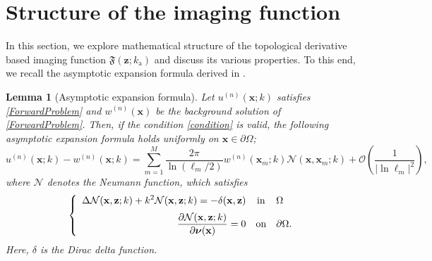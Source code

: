 \documentclass[a4,10pt]{article}
\newcommand{\ka}{k_{\mathrm{a}}}
\newcommand{\p}{\partial}
\newcommand{\mx}{\mathbf{x}}
\newcommand{\mz}{\mathbf{z}}
\newcommand{\vn}{\boldsymbol{\nu}}
\theoremstyle{plain}
\newtheorem{lemma}{Lemma}[section]
\theoremstyle{remark}
\begin{document}
\section{Structure of the imaging function}\label{sec:3}
In this section, we explore mathematical structure of the topological derivative based imaging function $\mathfrak{F}(\mz;\ka)$ and discuss its various properties. To this end, we recall the asymptotic expansion formula derived in \cite{AKLP}.

\begin{lemma}[Asymptotic expansion formula]
Let $u^{(n)}(\mx;k)$ satisfies \eqref{ForwardProblem} and $w^{(n)}(\mx)$ be the background solution of \eqref{ForwardProblem}. Then, if the condition \eqref{condition} is valid, the following asymptotic expansion formula holds uniformly on $\mx\in\p\Omega$;
\begin{equation}\label{Asymptoticformula}
u^{(n)}(\mx;k)-w^{(n)}(\mx;k)=\sum_{m=1}^{M}\frac{2\pi}{\ln(\ell_m/2)}w^{(n)}(\mx_m;k)\mathcal{N}(\mx,\mx_m;k)+\mathcal{O}\left(\frac{1}{|\ln\ell_m|^2}\right),
\end{equation}
where $\mathcal{N}$ denotes the Neumann function, which satisfies
\[\left\{\begin{array}{rcl}
    \displaystyle\Delta \mathcal{N}(\mx,\mz;k)+k^2\mathcal{N}(\mx,\mz;k)=-\delta(\mx,\mz)&\mbox{in}&\Omega\\
\noalign{\medskip}\displaystyle\frac{\p\mathcal{N}(\mx,\mz;k)}{\p\vn(\mx)}=0&\mbox{on}&\p\Omega.
  \end{array}\right.\]
Here, $\delta$ is the Dirac delta function.
\end{lemma}
\end{document}
